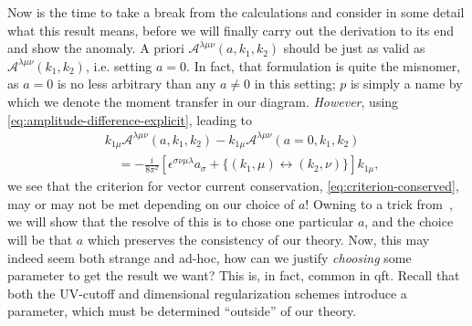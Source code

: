 Now is the time to take a break from the calculations and consider in some detail what this result means, before we will finally carry out the derivation to its end and show the anomaly.
A priori $\mathcal{A}^{\lambda \mu \nu }(a, k_1, k_2)$ should be just as valid as $\mathcal{A}^{\lambda \mu \nu }(k_1,  k_2)$, i.e. setting $a=0$.
In fact, that formulation is quite the misnomer, as $a=0$ is no less arbitrary than any $a\neq 0$ in this setting;
$p$ is simply a name by which we denote the moment transfer in our diagram.
\emph{However}, using \cref{eq:amplitude-difference-explicit}, leading to
\begin{equation}
  \label{eq:19}
  \begin{split}
  &k_{1\mu } \mathcal{A}^{\lambda \mu \nu }(a, k_1, k_2) - k_{1\mu }\mathcal{A}^{\lambda \mu \nu }(a=0, k_1, k_2) \\
 &\quad = -\frac{i}{8\pi^2} \left[
  \epsilon ^{\sigma \nu \mu \lambda } a_{\sigma } +  \{(k_1,\mu ) \leftrightarrow (k_2, \nu )\} \right] k_{1\mu }, 
  \end{split}
\end{equation}
we see that the criterion for vector current conservation, \cref{eq:criterion-conserved}, may or may not be met depending on our choice of $a$!
Owning to a trick from~\textcite{zeeQuantumFieldTheory2010}, we will show that the resolve of this is to chose one particular $a$, and the choice will be that $a$ which preserves the consistency of our theory.
Now, this may indeed seem both strange and ad-hoc, how can we justify \emph{choosing} some parameter to get the result we want?
This is, in fact, common in \gls{qft}.
Recall that both the UV-cutoff and dimensional regularization schemes introduce a parameter, which must be determined ``outside'' of our theory.

